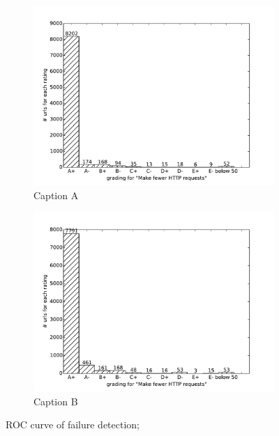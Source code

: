 \documentclass[conference]{IEEEtran}
\begin{document}
\begin{figure}
    \centering
    \begin{subfigure}[b]{\columnwidth}        %
        \centering
	\includegraphics[scale=0.40]{img/virtual-labs/container/Make fewer HTTP requests.pdf}
        \caption{Caption A}
        \label{fig:C}
    \end{subfigure}
    \hfill
    \begin{subfigure}[b]{\columnwidth}        %
        \centering
	\includegraphics[scale=0.40]{img/virtual-labs/deploy/Make fewer HTTP requests.pdf}
        \caption{Caption B}
        \label{fig:D}
    \end{subfigure}
    \caption{ROC curve of failure detection;}
    \label{fig:roc_curve2}
\end{figure}
\end{document}
